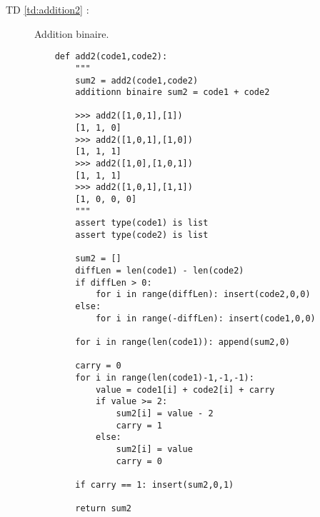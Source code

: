 \begin{minipage}[t]{10cm}
\begin{description}

\item[TD \ref{td:addition2} :] Addition binaire.

	\begin{py}{10cm}
	\begin{verbatim}
	def add2(code1,code2):
	    """
	    sum2 = add2(code1,code2)
	    additionn binaire sum2 = code1 + code2

	    >>> add2([1,0,1],[1])
	    [1, 1, 0]
	    >>> add2([1,0,1],[1,0])
	    [1, 1, 1]
	    >>> add2([1,0],[1,0,1])
	    [1, 1, 1]
	    >>> add2([1,0,1],[1,1])
	    [1, 0, 0, 0]
	    """
	    assert type(code1) is list
	    assert type(code2) is list

	    sum2 = []
	    diffLen = len(code1) - len(code2)
	    if diffLen > 0:
        	for i in range(diffLen): insert(code2,0,0)
	    else:
        	for i in range(-diffLen): insert(code1,0,0)

	    for i in range(len(code1)): append(sum2,0)

	    carry = 0
	    for i in range(len(code1)-1,-1,-1):
        	value = code1[i] + code2[i] + carry
        	if value >= 2:
        	    sum2[i] = value - 2
        	    carry = 1
        	else:
        	    sum2[i] = value
        	    carry = 0

	    if carry == 1: insert(sum2,0,1)

	    return sum2
	\end{verbatim}
	\end{py}
\end{description}
\end{minipage}
\hfill
